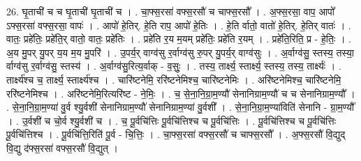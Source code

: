 \documentclass[17pt]{extarticle}
\begin{document}
26. घृ॒ताची॑ च च घृ॒ताची॑ घृ॒ताची॑ च । . चा॒फ्स॒रसा॑ वफ्स॒रसौ॑ च चाफ्स॒रसौ᳚ । . अ॒फ्स॒रसा॒ वाप॒ आपो᳚ ऽफ्स॒रसा॑ वफ्स॒रसा॒ वापः॑ । . आपो॑ हे॒तिर्. हे॒ति राप॒ आपो॑ हे॒तिः । . हे॒ति र्वातो॒ वातो॑ हे॒तिर्. हे॒तिर् वातः॑ । . वातः॒ प्रहे॑तिः॒ प्रहे॑ति॒र् वातो॒ वातः॒ प्रहे॑तिः । . प्रहे॑ति र॒य म॒यम् प्रहे॑तिः॒ प्रहे॑ति र॒यम् । . प्रहे॑ति॒रिति॒ प्र - हे॒तिः॒ । . अ॒य मु॒पर् यु॒पर् य॒य म॒य मु॒परि॑ । . उ॒पर्य॒र् वाग्व॑सु र॒र्वाग्व॑सु रु॒पर् यु॒पर्य॒र् वाग्व॑सुः । . अ॒र्वाग्व॑सु॒ स्तस्य॒ तस्या॒ र्वाग्व॑सु र॒र्वाग्व॑सु॒ स्तस्य॑ । . अ॒र्वाग्व॑सु॒रित्य॒र्वाक् - व॒सुः॒ । . तस्य॒ तार्क्ष्य॒ स्तार्क्ष्य॒ स्तस्य॒ तस्य॒ तार्क्ष्यः॑ । . तार्क्ष्य॑श्च च॒ तार्क्ष्य॒ स्तार्क्ष्य॑श्च । . चारि॑ष्टनेमि॒ ररि॑ष्टनेमिश्च॒ चारि॑ष्टनेमिः । . अरि॑ष्टनेमिश्च॒ चारि॑ष्टनेमि॒ ररि॑ष्टनेमिश्च । . अरि॑ष्टनेमि॒रित्यरि॑ष्ट - ने॒मिः॒ । . च॒ से॒ना॒नि॒ग्रा॒म॒ण्यौ॑ सेनानिग्राम॒ण्यौ॑ च च सेनानिग्राम॒ण्यौ᳚ । . से॒ना॒नि॒ग्रा॒म॒ण्या॑ वु॒र्व श्यु॒र्वशी॑ सेनानिग्राम॒ण्यौ॑ सेनानिग्राम॒ण्या॑ वु॒र्वशी᳚ । . से॒ना॒नि॒ग्रा॒म॒ण्या॑विति॑ सेनानि - ग्रा॒म॒ण्यौ᳚ । . उ॒र्वशी॑ च चो॒र्व श्यु॒र्वशी॑ च । . च॒ पू॒र्वचि॑त्तिः पू॒र्वचि॑त्तिश्च च पू॒र्वचि॑त्तिः । . पू॒र्वचि॑त्तिश्च च पू॒र्वचि॑त्तिः पू॒र्वचि॑त्तिश्च । . पू॒र्वचि॑त्ति॒रिति॑ पू॒र्व - चि॒त्तिः॒ । . चा॒फ्स॒रसा॑ वफ्स॒रसौ॑ च चाफ्स॒रसौ᳚ । . अ॒फ्स॒रसौ॑ वि॒द्युद् वि॒द्यु द॑फ्स॒रसा॑ वफ्स॒रसौ॑ वि॒द्युत् । \newline
\end{document}
